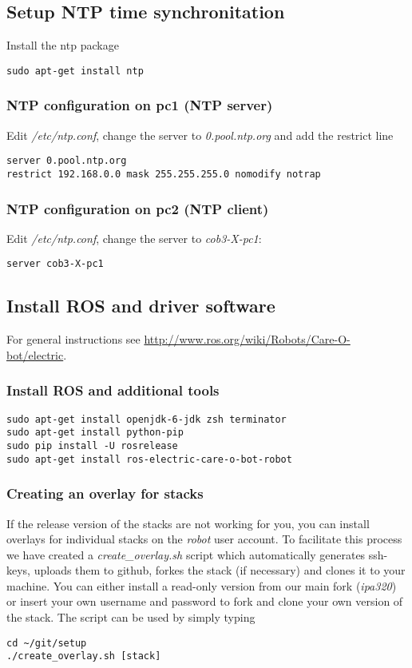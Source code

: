 \subsection{Setup NTP time synchronitation}
Install the ntp package

\begin{lstlisting}
sudo apt-get install ntp
\end{lstlisting}

\subsubsection{NTP configuration on pc1 (NTP server)}
Edit \textit{/etc/ntp.conf}, change the server to \textit{0.pool.ntp.org} and add the restrict line

\begin{lstlisting} 
server 0.pool.ntp.org
restrict 192.168.0.0 mask 255.255.255.0 nomodify notrap
\end{lstlisting}

\subsubsection{NTP configuration on pc2 (NTP client)}
Edit \textit{/etc/ntp.conf}, change the server to \textit{cob3-X-pc1}:
\begin{lstlisting}
server cob3-X-pc1
\end{lstlisting}

\subsection{Install ROS and 
 driver software}
For general instructions see \url{http://www.ros.org/wiki/Robots/Care-O-bot/electric}.

\subsubsection{Install ROS and additional tools}
\begin{lstlisting}
sudo apt-get install openjdk-6-jdk zsh terminator
sudo apt-get install python-pip
sudo pip install -U rosrelease
sudo apt-get install ros-electric-care-o-bot-robot
\end{lstlisting}

\subsubsection{Creating an overlay for stacks}
If the release version of the stacks are not working for you, you can install overlays for individual stacks on the \textit{robot} user account. To facilitate this process we have created a \textit{create\_overlay.sh} script which automatically generates ssh-keys, uploads them to github, forkes the stack (if necessary) and clones it to your machine. You can either install a read-only version from our main fork (\textit{ipa320}) or insert your own username and password to fork and clone your own version of the stack. The script can be used by simply typing
\begin{lstlisting}
cd ~/git/setup
./create_overlay.sh [stack]
\end{lstlisting}

